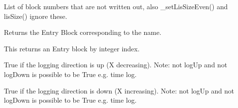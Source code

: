 \documentclass[letterpaper,10pt,english]{sphinxmanual}
\begin{document}
\begin{fulllineitems}
\begin{fulllineitems}
\end{fulllineitems}


\begin{fulllineitems}
\label{\detokenize{ref/LIS/core/LogiRec:TotalDepth.LIS.core.LogiRec.EntryBlockSet.BLOCKS_TO_SKIP}}
List of block numbers that are not written out, also \_setLisSizeEven()
and lisSize() ignore these.

\end{fulllineitems}


\begin{fulllineitems}
\label{\detokenize{ref/LIS/core/LogiRec:TotalDepth.LIS.core.LogiRec.EntryBlockSet.__getattr__}}
Returns the Entry Block corresponding to the name.

\end{fulllineitems}


\begin{fulllineitems}
\label{\detokenize{ref/LIS/core/LogiRec:TotalDepth.LIS.core.LogiRec.EntryBlockSet.__getitem__}}
This returns an Entry block by integer index.

\end{fulllineitems}


\begin{fulllineitems}
\label{\detokenize{ref/LIS/core/LogiRec:TotalDepth.LIS.core.LogiRec.EntryBlockSet.logUp}}
True if the logging direction is up (X decreasing).
Note: not logUp and not logDown is possible to be True e.g. time log.

\end{fulllineitems}


\begin{fulllineitems}
\label{\detokenize{ref/LIS/core/LogiRec:TotalDepth.LIS.core.LogiRec.EntryBlockSet.logDown}}
True if the logging direction is down (X increasing).
Note: not logUp and not logDown is possible to be True e.g. time log.


\end{fulllineitems}
\end{fulllineitems}
\end{document}
